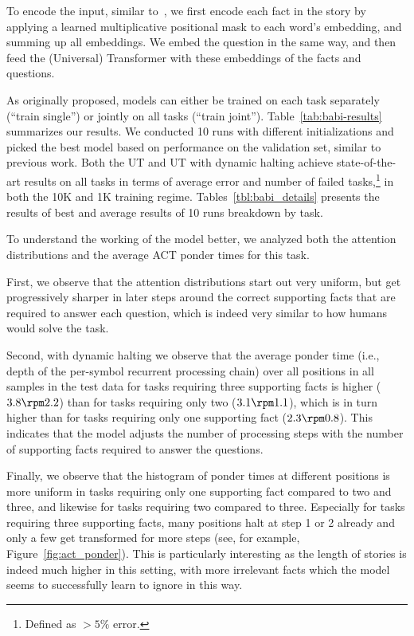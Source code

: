 


To encode the input, similar to~\cite{henaff2016tracking}, we first encode each fact in the story by applying a learned multiplicative positional mask to each word's embedding, and summing up all embeddings.
We embed the question in the same way, and then feed the (Universal) Transformer with these embeddings of the facts and questions. 

As originally proposed, models can either be trained on each task separately (``train single'') or jointly on all tasks (``train joint''). Table~\ref{tab:babi-results} summarizes our results. We conducted 10 runs with different initializations and picked the best model based on performance on the validation set, similar to previous work. Both the UT and UT with dynamic halting achieve state-of-the-art results on all tasks in terms of average error and number of failed tasks,\footnote{Defined as $> 5\%$ error.} in both the 10K and 1K training regime. Tables~\ref{tbl:babi_details} presents the results of best and average results of 10 runs breakdown by task.

To understand the working of the model better, we analyzed both the attention distributions and the average ACT ponder times for this task. 

First, we observe that the attention distributions start out very uniform, but get progressively sharper in later steps around the correct supporting facts that are required to answer each question, which is indeed very similar to how humans would solve the task. 

Second, with dynamic halting we observe that the average ponder time (i.e., depth of the per-symbol recurrent processing chain) over all positions in all samples in the test data for tasks requiring three supporting facts is higher ($3.8 \rpm 2.2$) than for tasks requiring only two ($3.1 \rpm 1.1$), which is in turn higher than for tasks requiring only one supporting fact ($2.3 \rpm 0.8$). This indicates that the model adjusts the number of processing steps with the number of supporting facts required to answer the questions. 

Finally, we observe that the histogram of ponder times at different positions is more uniform in tasks requiring only one supporting fact compared to two and three, and likewise for tasks requiring two compared to three.  Especially for tasks requiring three supporting facts, many positions halt at step 1 or 2 already and only a few get transformed for more steps (see, for example, Figure~\ref{fig:act_ponder}). This is particularly interesting as the length of stories is indeed much higher in this setting, with more irrelevant facts which the model seems to successfully learn to ignore in this way.

